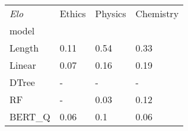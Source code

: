 \begin{tabular}{llll}
\toprule
\textit{Elo} & Ethics & Physics & Chemistry \\
model  &        &         &           \\
\midrule
Length &   0.11 &    0.54 &      0.33 \\
Linear &   0.07 &    0.16 &      0.19 \\
DTree  &      - &       - &         - \\
RF     &      - &    0.03 &      0.12 \\
BERT\_Q &   0.06 &     0.1 &      0.06 \\
\bottomrule
\end{tabular}
